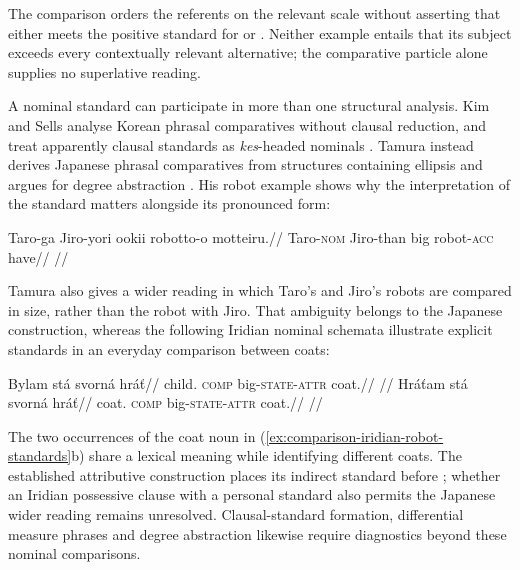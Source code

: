 The comparison orders the referents on the relevant scale without asserting
that either meets the positive standard for  or .
Neither example entails that its subject exceeds every contextually relevant
alternative; the comparative particle alone supplies no superlative reading.

A nominal standard can participate in more than one structural analysis.
Kim and Sells analyse Korean phrasal comparatives without clausal reduction,
and treat apparently clausal standards as \textit{kes}-headed nominals
\cite{kimsells2010comparatives}. Tamura instead derives Japanese phrasal
comparatives from structures containing ellipsis and argues for degree
abstraction \cite[ch.~2, especially §2.6]{tamura2026comparison}. His robot
example shows why the interpretation of the standard matters alongside its
pronounced form:

\ex\label{ex:comparison-japanese-robot}%
\begingl
\gla Taro-ga Jiro-yori ookii robotto-o motteiru.//
\glb Taro-\textsc{nom} Jiro-than big robot-\textsc{acc} have//
\glft {}
//
\endgl
\xe

Tamura also gives a wider reading in which Taro's and Jiro's robots are
compared in size, rather than the robot with Jiro. That
ambiguity belongs to the Japanese construction, whereas the following
Iridian nominal schemata illustrate explicit standards in an everyday
comparison between coats:

\pex\label{ex:comparison-iridian-robot-standards}
\a
\begingl
\gla Bylam stá svorná hráť//
\glb child.\Ind{} \textsc{comp} big-\textsc{state}-\textsc{attr} coat.\Dir{}//
\glft {}
//
\endgl
\a
\begingl
\gla Hráťam stá svorná hráť//
\glb coat.\Ind{} \textsc{comp} big-\textsc{state}-\textsc{attr} coat.\Dir{}//
\glft {}
//
\endgl
\xe

The two occurrences of the coat noun in
(\ref{ex:comparison-iridian-robot-standards}b) share a lexical meaning while
identifying different coats. The established attributive construction
places its indirect standard before ; whether an Iridian
possessive clause with a personal standard also permits the Japanese wider
reading remains unresolved. Clausal-standard formation, differential
measure phrases and degree abstraction likewise require diagnostics beyond
these nominal comparisons.


